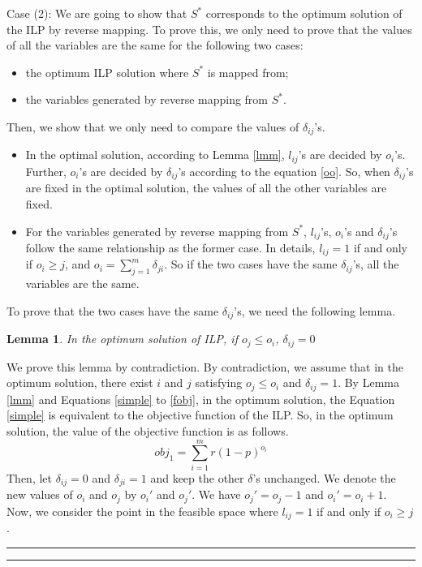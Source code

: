 \documentclass[letterpaper]{article}
\newenvironment{proof}{{Proof:}}{\hfill\rule{2mm}{2mm}}
\newtheorem{lemma}{Lemma}
\begin{document}
\begin{proof}
	Case (2): We are going to show that $S^*$ corresponds to the optimum solution of the ILP by reverse mapping. 
	To prove this, we only need to prove that the values of all the variables are the same for the following two cases:
	\begin{itemize}
		\item the optimum ILP solution where $S^*$ is mapped from;
		\item  the variables generated by reverse mapping from $S^*$.
	\end{itemize}
	Then, we show that we only need to compare the values of $\delta_{ij}$'s.
	\begin{itemize}
		\item In the optimal solution, according to Lemma \ref{lmm}, $l_{ij}$'s are decided by $o_i$'s.
		Further, $o_i$'s are decided by $\delta_{ij}$'s according to the equation \ref{oo}.
		So, when $\delta_{ij}$'s are fixed in  the optimal solution, the values of all the other variables are fixed.
		\item For the variables generated by reverse mapping from $S^*$,  $l_{ij}$'s, $o_i$'s and $\delta_{ij}$'s follow the same relationship as the former case. In details, $l_{ij}=1$ if and only if $o_i\geq j$, and $o_i=\sum_{j=1}^{m}\delta_{ji}$. So if the two cases have the same $\delta_{ij}$'s, all the variables are the same.
	\end{itemize}
	To prove that the two cases have the same $\delta_{ij}$'s, we need the following lemma.
	\begin{lemma}\label{lmmcore}
		In the optimum solution of ILP, if $o_j\leq o_i$, $\delta_{ij}=0$
	\end{lemma}
	\begin{proof}
		We prove this lemma by contradiction.
		By contradiction, we assume that in the optimum solution, there exist $i$ and $j$ satisfying $o_j\leq o_i$ and $\delta_{ij}=1$.
		By Lemma \ref{lmm} and Equations \ref{simple} to \ref{fobj}, in the optimum solution, the Equation \ref{simple} is equivalent to the objective function of the ILP.
		So, in the optimum solution, the value of the objective function is as follows.
		\begin{equation}
		obj_1=\sum_{i=1}^m r(1-p)^{o_i}
		\end{equation}
		Then, let $\delta_{ij}=0$ and $\delta_{ji}=1$ and keep the other $\delta$'s unchanged.
		We denote the new values of $o_i$ and $o_j$ by $o_i'$ and $o_j'$.
		We have $o_j'=o_j-1$ and $o_i'=o_i+1$.
		Now, we consider the point in the feasible space where $l_{ij}=1$ if and only if $o_i\geq j$.

\end{proof}
\end{proof}
\end{document}
